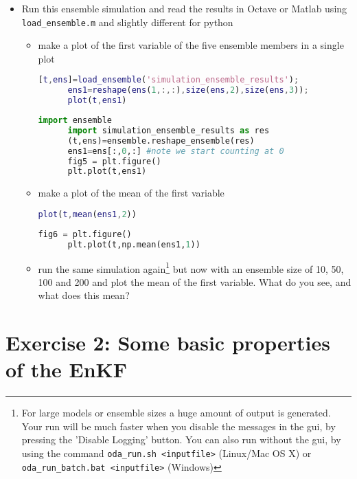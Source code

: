 \documentclass[a4paper,10pt]{article}
\begin{document}
\begin{itemize}
      
\item Run this ensemble simulation and read the results in Octave or
      Matlab using {\tt load\_ensemble.m} and slightly different for python
      \begin{itemize}
      \item make a plot of the first variable of the five ensemble
            members in a single plot
      \begin{lstlisting}[language=Matlab,frame=single,caption={Matlab}]
      [t,ens]=load_ensemble('simulation_ensemble_results');
      ens1=reshape(ens(1,:,:),size(ens,2),size(ens,3));
      plot(t,ens1)
      \end{lstlisting}
      \begin{lstlisting}[language=Python,frame=single,caption={Python}]
      import ensemble
      import simulation_ensemble_results as res
      (t,ens)=ensemble.reshape_ensemble(res)
      ens1=ens[:,0,:] #note we start counting at 0
      fig5 = plt.figure()
      plt.plot(t,ens1)
      \end{lstlisting}
      \item make a plot of the mean of the first variable
      \begin{lstlisting}[language=Matlab,frame=single,caption={Matlab}]
      plot(t,mean(ens1,2))
      \end{lstlisting}
      \begin{lstlisting}[language=Python,frame=single,caption={Python}]
      fig6 = plt.figure()
      plt.plot(t,np.mean(ens1,1))
      \end{lstlisting}
      \item run the same simulation again\footnote{For large models or
            ensemble sizes a huge amount of output is generated. Your
            run will be much faster when you disable the messages in
            the gui, by pressing the 'Disable Logging' button.
            You can also run without the gui, by using the command
            {\tt oda\_run.sh <inputfile>} (Linux/Mac OS X) or
            {\tt oda\_run\_batch.bat <inputfile>} (Windows)}
            but now with an ensemble size of 10, 50, 100 and 200 and
            plot the mean of the first variable. What do you see, and
            what does this mean?
      \end{itemize}
\end{itemize}

\section{Exercise 2: Some basic properties of the EnKF}
\end{document}
